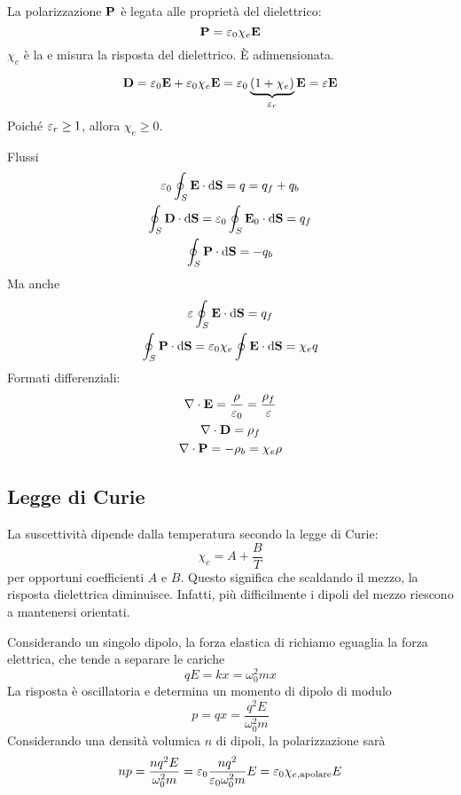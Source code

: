 La polarizzazione $\mathbf{P}$ è legata alle proprietà del dielettrico:
\begin{equation}
    \mathbf{P} = \varepsilon_0 \chi_e \mathbf{E}
\end{equation}
$\chi_e$ è la  e misura la risposta del dielettrico.
È adimensionata.

\begin{equation}
    \mathbf{D} = \varepsilon_0\mathbf{E} + \varepsilon_0 \chi_e \mathbf{E} = \varepsilon_0 \underbrace{(1 + \chi_e)}_{\varepsilon_r} \mathbf{E} = \varepsilon \mathbf{E}
\end{equation}
Poiché $\varepsilon_r \ge 1$, allora $\chi_e \ge 0$.

Flussi
\begin{subequations}
\begin{gather}
    \varepsilon_0 \oint_S \mathbf{E} \cdot \mathrm{d} \mathbf{S} = q = q_f + q_b \\
    \oint_S \mathbf{D} \cdot \mathrm{d} \mathbf{S} = \varepsilon_0 \oint_S \mathbf{E}_0 \cdot \mathrm{d} \mathbf{S} = q_f \\
    \oint_S \mathbf{P} \cdot \mathrm{d} \mathbf{S} = -q_b
\end{gather}
\end{subequations}
Ma anche
\begin{gather}
    \varepsilon \oint_S \mathbf{E} \cdot \mathrm{d} \mathbf{S} = q_f \\
    \oint_S \mathbf{P} \cdot \mathrm{d} \mathbf{S} = \varepsilon_0 \chi_e \oint \mathbf{E} \cdot \mathrm{d} \mathbf{S} = \chi_e q
\end{gather}
Formati differenziali:
\begin{subequations}
\begin{gather}
    \nabla \cdot \mathbf{E} = \frac{\rho}{\varepsilon_0} = \frac{\rho_f}{\varepsilon} \\
    \nabla \cdot \mathbf{D} = \rho_f \\
    \nabla \cdot \mathbf{P} = -\rho_b = \chi_e \rho
\end{gather}
\end{subequations}

\subsection{Legge di Curie}

La suscettività dipende dalla temperatura secondo la legge di Curie:
\begin{equation}
    \chi_e = A + \frac{B}{T}
\end{equation}
per opportuni coefficienti $A$ e $B$.
Questo significa che scaldando il mezzo, la risposta dielettrica diminuisce.
Infatti, più difficilmente i dipoli del mezzo riescono a mantenersi orientati.

Considerando un singolo dipolo, la forza elastica di richiamo eguaglia la forza elettrica, che tende a separare le cariche
\begin{equation}
    q E = k x = \omega_0^2 m x
\end{equation}
La risposta è oscillatoria e determina un momento di dipolo di modulo
\begin{equation}
    p = q x = \frac{q^2 E}{\omega_0^2 m}
\end{equation}
Considerando una densità volumica $n$ di dipoli, la polarizzazione sarà
\begin{equation}
    n p = \frac{n q^2 E}{\omega_0^2 m} = \varepsilon_0 \frac{n q^2}{\varepsilon_0 \omega_0^2 m} E = \varepsilon_0 \chi_{e,\text{apolare}} E
\end{equation}

